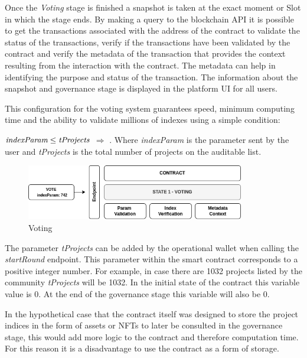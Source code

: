 \documentclass[12pt]{article}
\begin{document}
Once the \emph{Voting} stage is finished a snapshot is taken at the exact moment or Slot in which the stage ends. By making a query to the blockchain API it is possible to get the transactions associated with the address of the contract to validate the status of the transactions, verify if the transactions have been validated by the contract and verify the metadata of the transaction that provides the context resulting from the interaction with the contract. The metadata can help in identifying the purpose and status of the transaction. The information about the snapshot and governance stage is displayed in the platform UI for all users.

This configuration for the voting system guarantees speed, minimum computing time and the ability to validate millions of indexes using a simple condition:

$\emph{indexParam} \leq \emph{tProjects}$  $\Rightarrow$ . Where \emph{indexParam} is the parameter sent by the user and \emph{tProjects} is the total number of projects on the auditable list.

\begin{figure}[ht]
  \centering
  \includegraphics[width=0.85\textwidth]{vote.png}
  \caption{Voting
  }
  \label{fig:mi_imagen}
\end{figure}

The parameter \emph{tProjects} can be added by the operational wallet when calling the \emph{startRound} endpoint. This parameter within the smart contract corresponds to a positive integer number. For example, in case there are 1032 projects listed by the community \emph{tProjects} will be 1032. In the initial state of the contract this variable value is 0. At the end of the governance stage this variable will also be 0.

In the hypothetical case that the contract itself was designed to store the project indices in the form of assets or NFTs to later be consulted in the governance stage, this would add more logic to the contract and therefore computation time. For this reason it is a disadvantage to use the contract as a form of storage.
\end{document}
